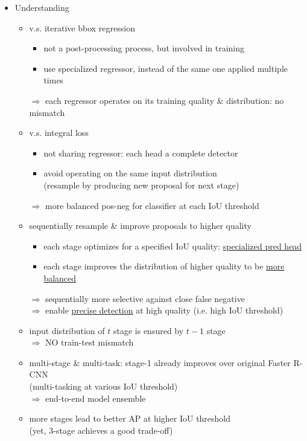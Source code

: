 \begin{itemize}
\begin{itemize}
	\item Understanding
		\begin{itemize}
		\item v.s. iterative bbox regression
			\begin{itemize}
			\item not a post-processing process, but involved in training
			\item use specialized regressor, instead of the same one applied multiple times
			\end{itemize}
		$\Rightarrow$ each regressor operates on its training quality \& distribution: no mismatch
		\item v.s. integral loss
			\begin{itemize}
			\item not sharing regressor: each head a complete detector
			\item avoid operating on the same input distribution \\
			(resample by producing new proposal for next stage)
			\end{itemize}
		$\Rightarrow$ more balanced pos-neg for classifier at each IoU threshold
		\item sequentially resample \& improve proposals to higher quality \\
			\begin{itemize}
			\item each stage optimizes for a specified IoU quality: \underline{specialized pred head}
			\item each stage improves the distribution of higher quality to be \underline{more balanced}
			\end{itemize}
		$\Rightarrow$ sequentially more selective against close false negative \\
		$\Rightarrow$ enable \underline{precise detection} at high quality (i.e. high IoU threshold)
		\item input distribution of $t$ stage is ensured by $t-1$ stage \\
		$\Rightarrow$ NO train-test mismatch
		\item multi-stage \& multi-task: stage-1 already improves over original Faster R-CNN \\
		(multi-tasking at various IoU threshold) \\
		$\Rightarrow$ end-to-end model ensemble
		\item more stages lead to better AP at higher IoU threshold \\
		(yet, 3-stage achieves a good trade-off)
		\end{itemize}
	\end{itemize}

\end{itemize}

